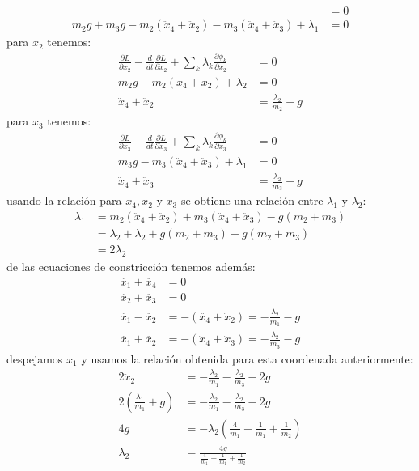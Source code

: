 \documentclass{article}
\begin{document}
\begin{tcolorbox}[breakable]
\begin{align*}
        &= 0  \\
        m_2g+m_3g - m_2(\ddot{x}_4+\ddot{x}_2) - m_3(\ddot{x}_4+\ddot{x}_3) + \lambda_1 &= 0
    \end{align*}
    para $x_2$ tenemos:
    \begin{align*}
        \frac{\partial L}{\partial x_2} 
        -\frac{d}{dt}\frac{\partial L}{\partial \dot{x}_2} 
        + \sum_k \lambda_k \frac{\partial \phi_k}{\partial x_2}
        &= 0  \\
        m_2g-m_2(\ddot{x}_4+\ddot{x}_2) + \lambda_2 &= 0 \\
        \ddot{x}_4+\ddot{x}_2 &= \frac{\lambda_2}{m_2} + g
    \end{align*}
    para $x_3$ tenemos:
    \begin{align*}
        \frac{\partial L}{\partial x_3} 
        -\frac{d}{dt}\frac{\partial L}{\partial \dot{x}_3} 
        + \sum_k \lambda_k \frac{\partial \phi_k}{\partial x_3}
        &= 0  \\
        m_3g - m_3(\ddot{x}_4+\ddot{x}_3) + \lambda_1 &= 0 \\
        \ddot{x}_4+ \ddot{x}_3 &= \frac{\lambda_2}{m_3}+g
    \end{align*}
    usando la relación para $x_4,x_2$ y $x_3$ se obtiene una relación entre $\lambda_1$ y $\lambda_2$:
    \begin{align*}
        \lambda_1 
        &= m_2(\ddot{x}_4+\ddot{x}_2) + m_3(\ddot{x}_4+\ddot{x}_3) - g(m_2+m_3) \\
        &= \lambda_2 + \lambda_2 + g(m_2+m_3) - g(m_2+m_3) \\
        &= 2\lambda_2 
    \end{align*}
    de las ecuaciones de constricción tenemos además:
    \begin{align*}
        \ddot{x_1}+\ddot{x_4} &= 0 \\
        \ddot{x_2}+\ddot{x_3} &= 0 \\ 
        \ddot{x_1}-\ddot{x_2} &= -(\ddot{x_4}+\ddot{x}_2) = -\tfrac{\lambda_2}{m_1}-g \\
        \ddot{x_1}+\ddot{x_2} &= -(\ddot{x}_4+\ddot{x}_3) = -\tfrac{\lambda_2}{m_3}-g 
    \end{align*}
    despejamos $x_1$ y usamos la relación obtenida para esta coordenada anteriormente:
    \begin{align*}
        2\ddot{x}_2 &= -\tfrac{\lambda_2}{m_1}-\tfrac{\lambda_2}{m_3}-2g \\
        2(\tfrac{\lambda_1}{m_1}+g) &= -\tfrac{\lambda_2}{m_1}-\tfrac{\lambda_2}{m_3}-2g \\
        4g &= -\lambda_2(\tfrac{4}{m_1}+\tfrac{1}{m_1}+\tfrac{1}{m_2}) \\
        \lambda_2 &= \frac{4g}{\tfrac{4}{m_1}+\tfrac{1}{m_1}+\tfrac{1}{m_2}} 
    \end{align*} 

\end{tcolorbox}
\end{document}

